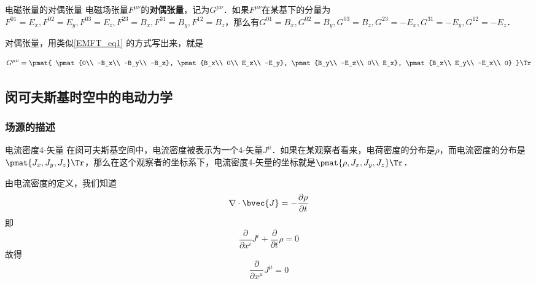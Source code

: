 \begin{definition}{电磁张量的对偶张量}
电磁场张量$F^{\mu\nu}$的\textbf{对偶张量}，记为$G^{\mu\nu}$．如果$F^{\mu\nu}$在某基下的分量为$F^{01}=E_x, F^{02}=E_y, F^{03}=E_z, F^{23}=B_x, F^{31}=B_y, F^{12}=B_z$，那么有$G^{01}=B_x, G^{02}=B_y, G^{03}=B_z, G^{23}=-E_x, G^{31}=-E_y, G^{12}=-E_z$．
\end{definition}

对偶张量，用类似\autoref{EMFT_eq1} 的方式写出来，就是

\begin{equation}
\begin{aligned}
G^{\mu\nu}=
\pmat{
\pmat{0\\ -B_x\\ -B_y\\ -B_z}, 
\pmat{B_x\\ 0\\ E_z\\ -E_y}, 
\pmat{B_y\\ -E_z\\ 0\\ E_x}, 
\pmat{B_z\\ E_y\\ -E_x\\ 0}
}\Tr
\end{aligned}
\end{equation}

\subsection{闵可夫斯基时空中的电动力学}

\subsubsection{场源的描述}

\begin{definition}{电流密度4-矢量}
在闵可夫斯基空间中，电流密度被表示为一个4-矢量$J^\mu$．如果在某观察者看来，电荷密度的分布是$\rho$，而电流密度的分布是$\pmat{J_x, J_y, J_z}\Tr$，那么在这个观察者的坐标系下，电流密度4-矢量的坐标就是$\pmat{\rho, J_x, J_y, J_z}\Tr$．
\end{definition}

由电流密度的定义，我们知道
\begin{equation}
\nabla\cdot\bvec{J}=-\frac{\partial\rho}{\partial t}
\end{equation}
即
\begin{equation}
\frac{\partial}{\partial x^i}J^i+\frac{\partial}{\partial t}\rho=0
\end{equation}
故得
\begin{equation}
\frac{\partial}{\partial x^\mu}J^\mu=0
\end{equation}

